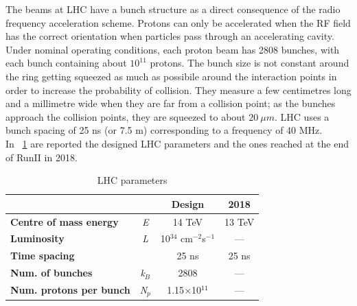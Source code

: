 The beams at LHC have a bunch structure as a direct consequence of the radio frequency acceleration scheme. Protons can only be accelerated when the RF field has the correct orientation when particles pass through an accelerating cavity. Under nominal operating conditions, each proton beam has 2808 bunches, with each bunch containing about $10^{11}$ protons. The bunch size is not constant around the ring getting squeezed as much as possibile around the interaction points in order to increase the probability of collision. They measure a few centimetres long and a millimetre wide when they are far from a collision point; as the bunches approach  the collision points, they are squeezed to about $20\ \mu m$. LHC uses a bunch spacing of 25 ns (or 7.5 m) corresponding to a frequency of 40 MHz. \\
In \tablename~\ref{LHC_parameteres} are reported the designed LHC parameters and the ones reached at the end of RunII in 2018.
\begin{table}[htbp]	
	\begin{center}
		\begin{tabular}{p{6cm}*{3}{c}}
			\hline   &  & Design & 2018  \\
			\hline
			\hline
			\bfseries Centre of mass energy & \emph{E} & 14 TeV & 13 TeV \\
			\hline
			\bfseries Luminosity & \emph{L} & 10$^{34}$ cm$^{-2}$s$^{-1}$ & --- \\
			\hline
			\bfseries Time spacing &  & 25 ns & 25 ns\\
			\hline
			\bfseries Num. of bunches& \emph{k$_{B}$} & 2808 & ---\\
			\hline
			\bfseries Num. protons per bunch & \emph{N$_{p}$} & 1.15$\times$10$^{11}$ & ---\\
			\hline
			\hline
		\end{tabular}
	\end{center}
	\caption{LHC parameters}
	\label{LHC_parameteres}
\end{table}



